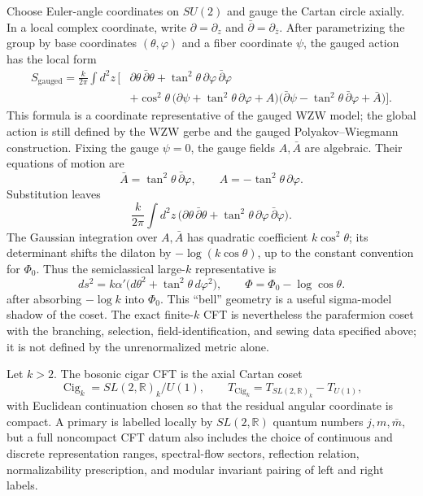 \begin{controlledapproximation}
\label{capprox:compact-coset-bell}
Choose Euler-angle coordinates on \(SU(2)\) and gauge the Cartan circle
axially.  In a local complex coordinate, write
\(\partial=\partial_z\) and \(\bar\partial=\partial_{\bar z}\).  After
parametrizing the group by base coordinates \((\theta,\varphi)\) and a
fiber coordinate \(\psi\), the gauged action has the local form
\begin{align}
  S_{\mathrm{gauged}}
  =
  \frac{k}{2\pi}
  \int d^2z\,\Big[
    &
    \partial\theta\,\bar\partial\theta
    +\tan^2\theta\,\partial\varphi\,\bar\partial\varphi
    \nonumber\\
    &
    +\cos^2\theta\,
    \bigl(\partial\psi+\tan^2\theta\,\partial\varphi+A\bigr)
    \bigl(\bar\partial\psi-\tan^2\theta\,\bar\partial\varphi+\bar A\bigr)
  \Big].
  \label{eq:compact-gauged-wzw-local-action}
\end{align}
This formula is a coordinate representative of the gauged WZW model; the
global action is still defined by the WZW gerbe and the gauged
Polyakov--Wiegmann construction.  Fixing the gauge \(\psi=0\), the gauge
fields \(A,\bar A\) are algebraic.  Their equations of motion are
\[
  \bar A=\tan^2\theta\,\bar\partial\varphi,
  \qquad
  A=-\tan^2\theta\,\partial\varphi .
\]
Substitution leaves
\[
  \frac{k}{2\pi}
  \int d^2z\,
  \bigl(
    \partial\theta\,\bar\partial\theta
    +\tan^2\theta\,\partial\varphi\,\bar\partial\varphi
  \bigr).
\]
The Gaussian integration over \(A,\bar A\) has quadratic coefficient
\(k\cos^2\theta\); its determinant shifts the dilaton by
\(-\log(k\cos\theta)\), up to the constant convention for \(\Phi_0\).  Thus
the semiclassical large-\(k\) representative is
\begin{equation}
  ds^2
  =
  k\alpha'\bigl(d\theta^2+\tan^2\theta\,d\varphi^2\bigr),
  \qquad
  \Phi
  =
  \Phi_0-\log\cos\theta .
  \label{eq:parafermion-bell-background}
\end{equation}
after absorbing \(-\log k\) into \(\Phi_0\).  This ``bell'' geometry is a
useful sigma-model shadow of the coset.  The exact finite-\(k\) CFT is
nevertheless the parafermion coset with the branching, selection,
field-identification, and sewing data specified above; it is not defined by
the unrenormalized metric alone.
\end{controlledapproximation}

\begin{definition}
\label{def:bosonic-cigar-coset}
Let \(k>2\).  The bosonic cigar CFT is the axial Cartan coset
\[
  \operatorname{Cig}_k
  =
  SL(2,\mathbb R)_k/U(1),
  \qquad
  T_{\operatorname{Cig}_k}=T_{SL(2,\mathbb R)_k}-T_{U(1)} ,
\]
with Euclidean continuation chosen so that the residual angular coordinate
is compact.  A primary is labelled locally by \(SL(2,\mathbb R)\) quantum
numbers \(j,m,\bar m\), but a full noncompact CFT datum also includes the
choice of continuous and discrete representation ranges, spectral-flow
sectors, reflection relation, normalizability prescription, and modular
invariant pairing of left and right labels.
\end{definition}

